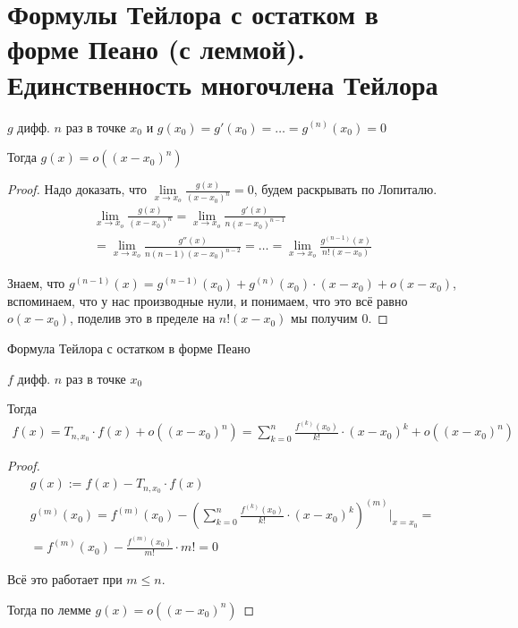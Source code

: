 \section{Формулы Тейлора с остатком в форме Пеано (с леммой). Единственность многочлена Тейлора}

\begin{lemma}
    
    $g$ дифф. $n$ раз в точке $x_0$ и $g(x_0) = g'(x_0) = \dots = g^{(n)}(x_0) = 0$

    Тогда $g(x) = o((x - x_0)^n)$

    \begin{proof}
        
        Надо доказать, что $\lim\limits_{x \to x_o} \frac{g(x)}{(x-x_0)^n} = 0$,
        будем раскрывать по Лопиталю.
        \begin{gather*}
            \lim\limits_{x \to x_o} \frac{g(x)}{(x-x_0)^n} = \lim\limits_{x \to x_o} \frac{g'(x)}{n(x-x_0)^{n-1}} \\ 
            = \lim\limits_{x \to x_o} \frac{g''(x)}{n(n-1)(x-x_0)^{n-2}} = \dots = \lim\limits_{x \to x_o} \frac{g^{(n-1)}(x)}{n!(x-x_0)}
        \end{gather*}

        Знаем, что $g^{(n-1)}(x) = g^{(n-1)}(x_0) + g^{(n)}(x_0) \cdot (x - x_0) + o(x - x_0)$, вспоминаем,
        что у нас производные нули, и понимаем, что это всё равно $o(x - x_0)$, поделив это в пределе на $n!(x-x_0)$ мы получим $0$.

    \end{proof}

\end{lemma}


\begin{theorem-non}
    Формула Тейлора с остатком в форме Пеано

    $f$ дифф. $n$ раз в точке $x_0$

    Тогда 
    \begin{gather*}
        f(x) = T_{n, x_0} \cdot f(x) + o((x - x_0)^n) = \sum_{k=0}^{n} \frac{f^{(k)}(x_0)}{k!} \cdot (x - x_0)^k + o((x - x_0)^n)
    \end{gather*}

    \begin{proof}

            \begin{gather*}
                g(x) := f(x) - T_{n, x_0} \cdot f(x) \\
                g^{(m)}(x_0) = f^{(m)}(x_0) - (\sum_{k = 0}^{n} \frac{f^{(k)}(x_0)}{k!} \cdot (x - x_0)^k)^{(m)} |_{x = x_0} = \\
                = f^{(m)}(x_0) - \frac{f^{(m)}(x_0)}{m!} \cdot m! = 0
            \end{gather*}

            Всё это работает при $m \leqslant n$.

            Тогда по лемме $g(x) = o((x - x_0)^n)$
    \end{proof}
\end{theorem-non}

